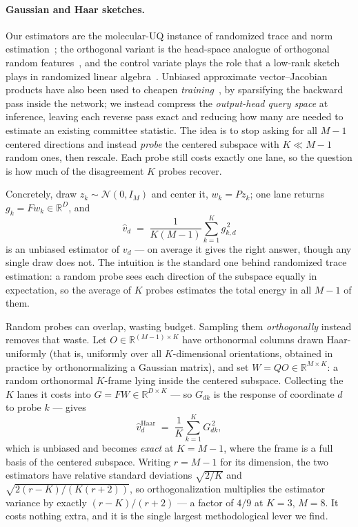 \documentclass{article}
\begin{document}
\paragraph{Gaussian and Haar sketches.}
Our estimators are the molecular-UQ instance of randomized trace and norm
estimation~\citep{hutchinson,avron2011,hutchpp}; the orthogonal variant is the head-space analogue of
orthogonal random features~\citep{yu2016orf}, and the control variate plays the role that a low-rank
sketch plays in randomized linear algebra~\citep{halko2011}. Unbiased approximate vector--Jacobian
products have also been used to cheapen \emph{training}~\citep{bakong2026vjp}, by sparsifying the
backward pass inside the network; we instead compress the \emph{output-head query space} at
inference, leaving each reverse pass exact and reducing how many are needed to estimate an existing
committee statistic.
The idea is to stop asking for all $M-1$ centered directions and instead \emph{probe} the centered
subspace with $K\ll M-1$ random ones, then rescale. Each probe still costs exactly one lane, so the
question is how much of the disagreement $K$ probes recover.

Concretely, draw $z_k\sim\mathcal N(0,I_M)$ and center it, $w_k=Pz_k$; one lane returns
$g_k=Fw_k\in\mathbb{R}^{D}$, and
\begin{equation}
\widehat v_d \;=\; \frac{1}{K(M-1)}\sum_{k=1}^{K} g_{k,d}^{\,2}
\end{equation}
is an unbiased estimator of $v_d$ --- on average it gives the right answer, though any single draw
does not. The intuition is the standard one behind randomized trace estimation: a random probe sees
each direction of the subspace equally in expectation, so the average of $K$ probes estimates the
total energy in all $M-1$ of them.

Random probes can overlap, wasting budget. Sampling them \emph{orthogonally} instead removes that
waste. Let $O\in\mathbb{R}^{(M-1)\times K}$ have orthonormal columns drawn Haar-uniformly (that is,
uniformly over all $K$-dimensional orientations, obtained in practice by orthonormalizing a Gaussian
matrix), and set $W=QO\in\mathbb{R}^{M\times K}$: a random orthonormal $K$-frame lying inside the
centered subspace. Collecting the $K$ lanes it costs into
$G=FW\in\mathbb{R}^{D\times K}$ --- so $G_{dk}$ is the response of coordinate $d$ to probe $k$ ---
gives
\begin{equation}
\widehat v^{\mathrm{Haar}}_d \;=\; \frac{1}{K}\sum_{k=1}^{K} G_{dk}^{\,2},
\end{equation}
which is unbiased and becomes \emph{exact} at $K=M-1$, where the frame is a full basis of the
centered subspace. Writing $r=M-1$ for its dimension, the two estimators have relative standard
deviations $\sqrt{2/K}$ and $\sqrt{2(r-K)/(K(r+2))}$, so orthogonalization multiplies the estimator
variance by exactly $(r-K)/(r+2)$ --- a factor of $4/9$ at $K{=}3$, $M{=}8$. It costs nothing extra,
and it is the single largest methodological lever we find.
\end{document}

